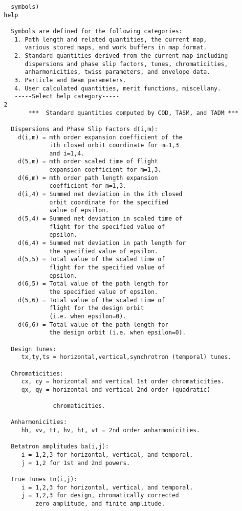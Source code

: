 \begin{footnotesize}
\begin{verbatim}
  symbols)
help

  Symbols are defined for the following categories:
   1. Path length and related quantities, the current map,
      various stored maps, and work buffers in map format.
   2. Standard quantities derived from the current map including
      dispersions and phase slip factors, tunes, chromaticities,
      anharmonicities, twiss parameters, and envelope data.
   3. Particle and Beam parameters.
   4. User calculated quantities, merit functions, miscellany.
   -----Select help category-----
2
       ***  Standard quantities computed by COD, TASM, and TADM ***

  Dispersions and Phase Slip Factors d(i,m):
    d(i,m) = mth order expansion coefficient of the
             ith closed orbit coordinate for m=1,3
             and i=1,4.
    d(5,m) = mth order scaled time of flight
             expansion coefficient for m=1,3.
    d(6,m) = mth order path length expansion
             coefficient for m=1,3.
    d(i,4) = Summed net deviation in the ith closed
             orbit coordinate for the specified
             value of epsilon.
    d(5,4) = Summed net deviation in scaled time of
             flight for the specified value of
             epsilon.
    d(6,4) = Summed net deviation in path length for
             the specified value of epsilon.
    d(5,5) = Total value of the scaled time of
             flight for the specified value of
             epsilon.
    d(6,5) = Total value of the path length for
             the specified value of epsilon.
    d(5,6) = Total value of the scaled time of
             flight for the design orbit
             (i.e. when epsilon=0).
    d(6,6) = Total value of the path length for
             the design orbit (i.e. when epsilon=0).

  Design Tunes:
     tx,ty,ts = horizontal,vertical,synchrotron (temporal) tunes.

  Chromaticities:
     cx, cy = horizontal and vertical 1st order chromaticities.
     qx, qy = horizontal and vertical 2nd order (quadratic)

       	      chromaticities.

  Anharmonicities:
     hh, vv, tt, hv, ht, vt = 2nd order anharmonicities.

  Betatron amplitudes ba(i,j):
     i = 1,2,3 for horizontal, vertical, and temporal.
     j = 1,2 for 1st and 2nd powers.

  True Tunes tn(i,j):
     i = 1,2,3 for horizontal, vertical, and temporal.
     j = 1,2,3 for design, chromatically corrected
         zero amplitude, and finite amplitude.


\end{verbatim}
\end{footnotesize}
